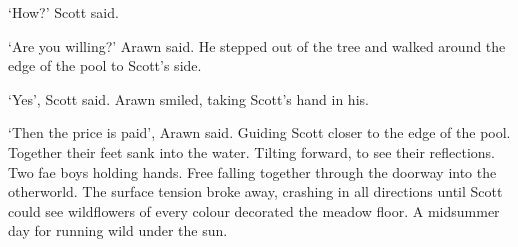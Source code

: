`How?' Scott said.

`Are you willing?' Arawn said. He stepped out of the tree and walked
around the edge of the pool to Scott's side.

`Yes', Scott said. Arawn smiled, taking Scott's hand in his.

`Then the price is paid', Arawn said. Guiding Scott closer to the
edge of the pool. Together their feet sank into the water. Tilting
forward, to see their reflections. Two fae boys holding hands. Free
falling together through the doorway into the otherworld. The surface
tension broke away, crashing in all directions until Scott could see
wildflowers of every colour decorated the meadow floor. A midsummer
day for running wild under the sun.

